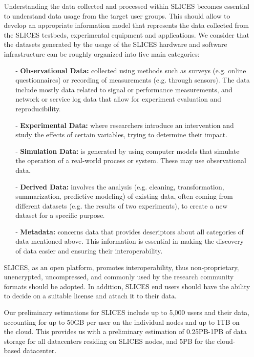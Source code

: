 Understanding the data collected and processed within SLICES becomes essential to understand data usage from the target user groups. This should allow to develop an appropriate information model that represents the data collected from the SLICES testbeds, experimental equipment and applications. We consider that the datasets generated by the usage of the SLICES hardware and software infrastructure can be roughly organized into five main categories:

\begin{itemize}
    \item[-] \textbf{Observational Data:}  collected using methods such as surveys (e.g. online questionnaires) or recording of measurements (e.g. through sensors). The data include mostly data related to signal or performance measurements, and network or service log data that allow for experiment evaluation and reproducibility. 
    \item[-] \textbf{Experimental Data: } where researchers introduce an intervention and study the effects of certain variables, trying to determine their impact.
    \item[-] \textbf{Simulation Data: } is generated by using computer models that simulate the operation of a real-world process or system. These may use observational data.
    \item[-] \textbf{Derived Data: } involves the analysis (e.g. cleaning, transformation, summarization, predictive modeling) of existing data, often coming from different datasets (e.g. the results of two experiments), to create a new dataset for a specific purpose. 
    \item[-] \textbf{Metadata:  } concerns data that provides descriptors about all categories of data mentioned above. This information is essential in making the discovery of data easier and ensuring their interoperability.
\end{itemize}

SLICES, as an open platform, promotes interoperability, thus non-proprietary, unencrypted, uncompressed, and commonly used by the research community formats should be adopted. In addition, SLICES end users should have the ability to decide on a suitable license and attach it to their data. 

Our preliminary estimations for SLICES include up to 5,000 users and their data, accounting for up to 50GB per user on the individual nodes and up to 1TB on the cloud. This provides us with a preliminary estimation of 0.25PB-1PB of data storage for all datacenters residing on SLICES nodes, and 5PB for the cloud-based datacenter.

